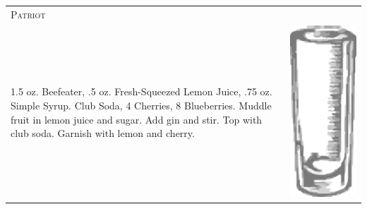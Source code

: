 \documentclass{article}
\begin{document}
\begin{multicols}{2}
\begin{tabular}{p{2in} p{0.5in}}
\multicolumn{2}{p{3in}}{\centering\Huge\textsc{Patriot}} \\ 
   \vspace{-0.1in}1.5 oz. Beefeater, .5 oz. Fresh-Squeezed Lemon Juice, .75 oz. Simple Syrup. Club Soda, 4 Cherries, 8 Blueberries. Muddle fruit in lemon juice and sugar. Add gin and stir. Top with club soda. Garnish with lemon and cherry. &
   \vspace{-0.1in} \includegraphics{collins.png}
\end{tabular}


\end{multicols}
\end{document}
